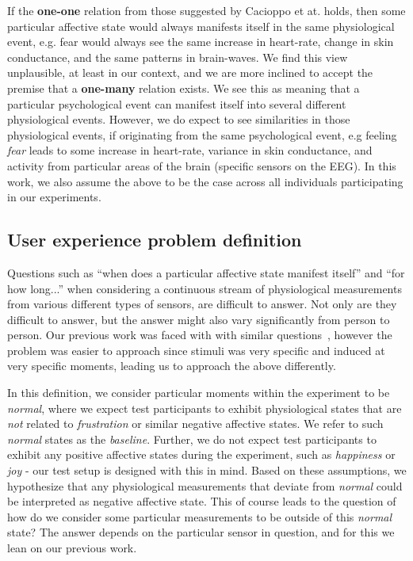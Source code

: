 If the \textbf{one-one} relation from those suggested by Cacioppo et at. holds, then some particular affective state
would always manifests itself in the same physiological event, e.g. fear would always see the same increase in
heart-rate, change in skin conductance, and the same patterns in brain-waves. We find this view unplausible, at least in
our context, and we are more inclined to accept the premise that a \textbf{one-many} relation exists. We see this as
meaning that a particular psychological event can manifest itself into several different physiological events. However,
we do expect to see similarities in those physiological events, if originating from the same psychological event, e.g
feeling \textit{fear} leads to some increase in heart-rate, variance in skin conductance, and activity from particular
areas of the brain (specific sensors on the EEG). In this work, we also assume the above to be the case across all
individuals participating in our experiments.

\subsection{User experience problem definition}
Questions such as ``when does a particular affective state manifest itself'' and ``for how long...'' when considering a
continuous stream of physiological measurements from various different types of sensors, are difficult to answer. Not
only are they difficult to answer, but the answer might also vary significantly from person to person. Our previous work
was faced with with similar questions~\cite{9th_semester_project}, however the problem was easier to approach since
stimuli was very specific and induced at very specific moments, leading us to approach the above differently.

In this definition, we consider particular moments within the experiment to be \textit{normal}, where we expect test
participants to exhibit physiological states that are \textit{not} related to \textit{frustration} or similar negative
affective states. We refer to such \textit{normal} states as the \textit{baseline}. Further, we do not expect test
participants to exhibit any positive affective states during the experiment, such as \textit{happiness} or \textit{joy}
- our test setup is designed with this in mind. Based on these assumptions, we hypothesize that any physiological
measurements that deviate from \textit{normal} could be interpreted as negative affective state. This of course leads to
the question of how do we consider some particular measurements to be outside of this \textit{normal} state? The answer
depends on the particular sensor in question, and for this we lean on our previous work.

